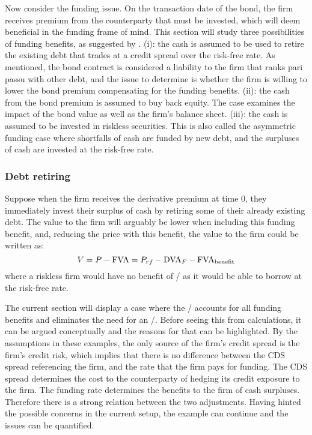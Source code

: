 \documentclass[main.tex]{subfiles}
\begin{document}
        Now consider the funding issue. On the transaction date of the bond, 
        the firm receives premium from the counterparty that must be invested, 
        which will deem beneficial in the funding frame of mind. 
        This section will study three possibilities of funding benefits, 
        as suggested by \textcite{Hillion2016}.
        (i): the cash is assumed to be used to retire the existing debt 
        that trades at a credit spread over the risk-free rate. 
        As mentioned, the bond contract is considered a liability to the firm
        that ranks pari passu with other debt, 
        and the issue to determine is whether the firm is willing to lower the bond premium 
        compensating for the funding benefits. 
        (ii): the cash from the bond premium is assumed to buy back equity. 
        The case examines the impact of the bond value as well as the firm's balance sheet. 
        (iii): the cash is assumed to be invested in riskless securities. 
        This is also called the asymmetric funding case where shortfalls of cash are funded by new debt, 
        and the surpluses of cash are invested at the risk-free rate.

        \subsubsection{Debt retiring}
            Suppose when the firm receives the derivative premium at time 0, 
            they immediately invest their surplus of cash by retiring some of their already existing debt. 
            The value to the firm will arguably be lower when including this funding benefit, 
            and, reducing the price with this benefit, the value to the firm could be written as:
            \begin{equation}
                V = P - \FVA/ = P_{rf} - \DVA/_F - \FBA/
            \end{equation}
            where a riskless firm would have no benefit of \FVA/ as it would be able to borrow at the risk-free rate.
            
            The current section will display a case where the \DVA/
            accounts for all funding benefits and eliminates the need for an \FVA/.
            Before seeing this from calculations, it can be argued conceptually
            and the reasons for that can be highlighted.
            By the assumptions in these examples,
            the only source of the firm's credit spread is the firm's credit risk, 
            which implies that there is no difference between the CDS spread referencing the firm,
            and the rate that the firm pays for funding.
            The CDS spread determines the cost to the counterparty 
            of hedging its credit exposure to the firm.
            The funding rate determines the benefits to the firm of cash surpluses.
            Therefore there is a strong relation between the two adjustments.
            Having hinted the possible concerns in the current setup, 
            the example can continue and the issues can be quantified.
\end{document}
